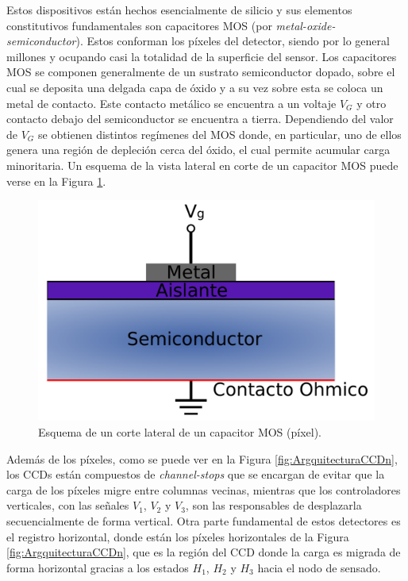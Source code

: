 Estos dispositivos están hechos esencialmente de silicio y sus elementos constitutivos fundamentales son capacitores MOS (por \textit{metal-oxide-semiconductor}). Estos conforman los píxeles del detector, siendo por lo general millones y ocupando casi la totalidad de la superficie del sensor. Los capacitores MOS se componen generalmente de un sustrato semiconductor dopado, sobre el cual se deposita una delgada capa de óxido y a su vez sobre esta se coloca un metal de contacto. Este contacto metálico se encuentra a un voltaje $V_{G}$ y otro contacto debajo del semiconductor se encuentra a tierra. Dependiendo del valor de $V_{G}$ se obtienen distintos regímenes del MOS\cite{Chenming} donde, en particular, uno de ellos genera una región de depleción cerca del óxido, el cual permite acumular carga minoritaria. Un esquema de la vista lateral en corte de un capacitor MOS puede verse en la Figura \ref{fig:PixelCrossSection}.
\begin{figure}[h]
    \centering
        \includegraphics[scale=.35]{Figs/PixelCrossSection.pdf}
    \caption{Esquema de un corte lateral de un capacitor MOS (píxel).}
    \label{fig:PixelCrossSection}
\end{figure}
Además de los píxeles, como se puede ver en la Figura \ref{fig:ArgquitecturaCCDn}, los CCDs están compuestos de \textit{channel-stops} que se encargan de evitar que la carga de los píxeles migre entre columnas vecinas, mientras que los controladores verticales, con las señales $V_{1}$, $V_{2}$ y $V_{3}$, son las responsables de desplazarla secuencialmente de forma vertical. 
Otra parte fundamental de estos detectores es el registro horizontal, donde están los píxeles horizontales de la Figura \ref{fig:ArgquitecturaCCDn}, que es la región del CCD donde la carga es migrada de forma horizontal gracias a los estados $H_{1}$, $H_{2}$ y $H_{3}$ hacia el nodo de sensado.
